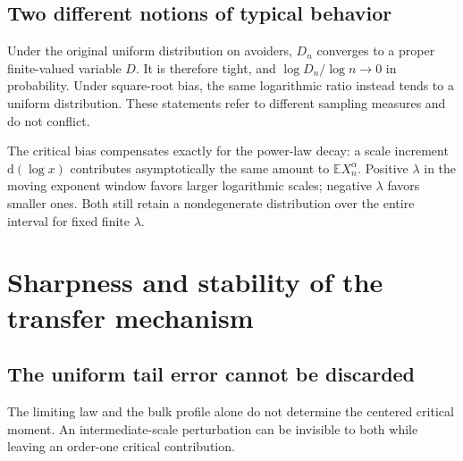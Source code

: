\documentclass[11pt,a4paper]{article}
\theoremstyle{definition}\newaliascnt{definition}{theorem}
\theoremstyle{remark}\newaliascnt{remark}{theorem}
\newcommand{\dd}{\mathrm d}
\newcommand{\ljE}{\mathbb E}
\begin{document}
\subsection{Two different notions of typical behavior}
Under the original uniform distribution on avoiders, $D_n$ converges to a
proper finite-valued variable $D$. It is therefore tight, and
$\log D_n/\log n\to0$ in probability. Under square-root bias, the same
logarithmic ratio instead tends to a uniform distribution. These statements
refer to different sampling measures and do not conflict.

The critical bias compensates exactly for the power-law decay: a scale
increment $\dd(\log x)$ contributes asymptotically the same amount to
$\ljE X_n^\alpha$. Positive $\lambda$ in the moving exponent window favors
larger logarithmic scales; negative $\lambda$ favors smaller ones. Both
still retain a nondegenerate distribution over the entire interval for
fixed finite $\lambda$.

\section{Sharpness and stability of the transfer mechanism}
\label{cjm:sec:sharpness}

\subsection{The uniform tail error cannot be discarded}
The limiting law and the bulk profile alone do not determine the centered
critical moment. An intermediate-scale perturbation can be invisible to
both while leaving an order-one critical contribution.
\end{document}
